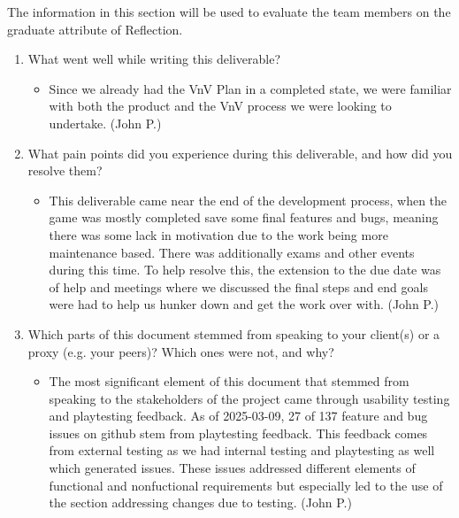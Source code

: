 \documentclass[12pt, titlepage]{article}
\begin{document}
The information in this section will be used to evaluate the team members on the
graduate attribute of Reflection.



\begin{enumerate}
  \item What went well while writing this deliverable?
  
\begin{itemize}
  \item Since we already had the VnV Plan in a completed state, we were familiar with both the product and the VnV process we were looking to undertake. (John P.)
\end{itemize}  
  
  \item What pain points did you experience during this deliverable, and how
    did you resolve them?
    
\begin{itemize}
  \item This deliverable came near the end of the development process, when the game was mostly completed save some final features and bugs, meaning there was some lack in motivation due to the work being more maintenance based. There was additionally exams and other events during this time. To help resolve this, the extension to the due date was of help and meetings where we discussed the final steps and end goals were had to help us hunker down and get the work over with. (John P.)
\end{itemize}    
    
  \item Which parts of this document stemmed from speaking to your client(s) or
  a proxy (e.g. your peers)? Which ones were not, and why?

\begin{itemize}
  \item The most significant element of this document that stemmed from speaking to the stakeholders of the project came through usability testing and playtesting feedback. As of 2025-03-09, 27 of 137 feature and bug issues on github stem from playtesting feedback. This feedback comes from external testing as we had internal testing and playtesting as well which generated issues. These issues addressed different elements of functional and nonfuctional requirements but especially led to the use of the section addressing changes due to testing. (John P.)
\end{itemize}
  

\end{enumerate}
\end{document}
